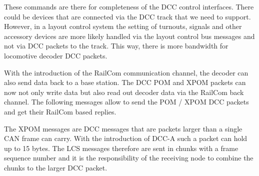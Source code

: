 These commands are there for completeness of the DCC control interfaces. There could be devices that are connected via the DCC track that we need to support. However, in a layout control system the setting of turnouts, signals and other accessory devices are more likely handled via the layout control bus messages and not via DCC packets to the track. This way, there is more bandwidth for locomotive decoder DCC packets.


With the introduction of the RailCom communication channel, the decoder can also send data back to a base station. The DCC POM and XPOM packets can now not only write data but also read out decoder data via the RailCom back channel. The following messages allow to send the POM / XPOM DCC packets and get their RailCom based replies.

\begin{table}[ht!]
    \centering 
\end{table}

The XPOM messages are DCC messages that are packets larger than a single CAN frame can carry. With the introduction of DCC-A such a packet can hold up to 15 bytes. The LCS messages therefore are sent in chunks with a frame sequence number and it is the responsibility of the receiving node to combine the chunks to the larger DCC packet.

